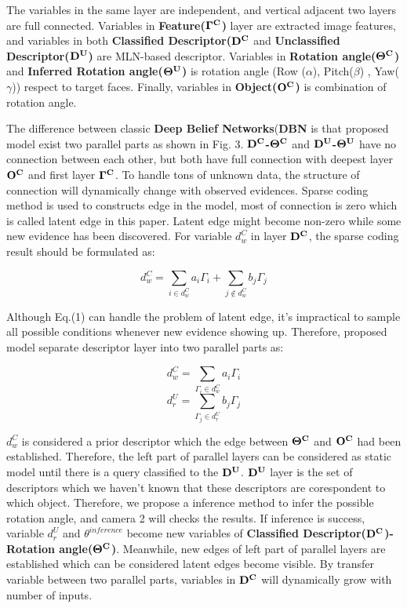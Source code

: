\documentclass[journal]{IEEEtran}
\begin{document}
The variables in the same layer are independent, and vertical adjacent two layers are full connected. Variables in \textbf{Feature($\bf{\Gamma^{C}}$)} layer are extracted image features, and variables in both \textbf{Classified Descriptor($\bf{D^C}$} and \textbf{Unclassified Descriptor($\bf{D^U}$)} are MLN-based descriptor. Variables in \textbf{Rotation angle($\bf{\Theta^{C}}$)} and \textbf{Inferred Rotation angle($\bf{\Theta^U}$)} is rotation angle (Row ($\alpha$), Pitch($\beta$) , Yaw($\gamma$)) respect to target faces. Finally, variables in \textbf{Object($\bf{O^C}$)} is combination of rotation angle.


The difference between classic \textbf{Deep Belief Networks}(\textbf{DBN} is that proposed model exist two parallel parts as shown in Fig. 3. \textbf{$\bf{D^C}$-$\bf{\Theta^{C}}$} and \textbf{$\bf{D^U}$-$\bf{\Theta^U}$} have no connection between each other, but both have full connection with deepest layer $\bf{O^C}$ and first layer \textbf{$\bf{\Gamma^{C}}$}. To handle tons of unknown data, the structure of connection will dynamically change with observed evidences. Sparse coding method is used to constructs edge in the model, most of connection is zero which is called latent edge in this paper. Latent edge might become non-zero while some new evidence has been discovered. For variable $d^C_w$ in layer $\bf{D^C}$, the sparse coding result should be formulated as:

\begin{equation}
d^C_w=\sum_{i\in{d^C_w}}a_{i}\Gamma_{i}+\sum_{j\notin{d^C_w}}b_{j}\Gamma_{j}
\end{equation}

Although Eq.(1) can handle the problem of latent edge, it's impractical to sample all possible conditions whenever new evidence showing up. Therefore, proposed model separate descriptor layer into two parallel parts as: 

\begin{equation}
d^C_w=\sum_{\Gamma_{i}\in{d^C_w}}a_{i}\Gamma_{i}
\end{equation}
\begin{equation}
d^U_r=\sum_{\Gamma_{j}\in{d^U_r}}b_{j}\Gamma_{j}
\end{equation}

$d^C_w$ is considered a prior descriptor which the edge between $\bf{\Theta^{C}}$ and $\bf{O^C}$ had been established. Therefore, the left part of parallel layers can be considered as static model until there is a query classified to the $\bf{D^U}$. $\bf{D^U}$ layer is the set of descriptors which we haven't known that these descriptors are corespondent to which object. Therefore, we propose a inference method to infer the possible rotation angle, and camera 2 will checks the results. If inference is success, variable $d^U_r$ and $\theta^{inference}$ become new variables of \textbf{Classified Descriptor($\bf{D^C}$)-Rotation angle($\bf{\Theta^{C}}$)}. Meanwhile, new edges of left part of parallel layers are established which can be considered latent edges become visible. By transfer variable between two parallel parts, variables in $\bf{D^C}$ will dynamically grow with number of inputs. 
\end{document}
